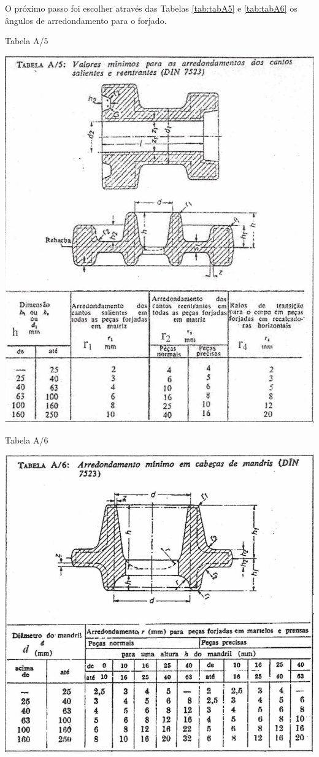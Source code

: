 \documentclass[deposito, acronym, symbols]{fei}
\begin{document}
O próximo passo foi escolher através das Tabelas \ref{tab:tabA5} e \ref{tab:tabA6} os ângulos de arredondamento para o forjado.
\newpage
\begin{table}[!htb]
 \centering
    \caption{Tabela A/5}
    \includegraphics[width=1\linewidth]{Imagens/Tabela A5.png}
    \label{tab:tabA5}
\end{table}

\begin{table}[!htb]
 \centering
    \caption{Tabela A/6}
    \includegraphics[width=1\linewidth]{Imagens/Tabela A6.png}
    \label{tab:tabA6}
\end{table}
\end{document}
